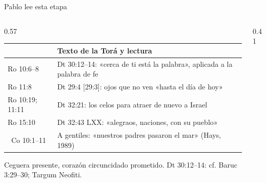 \begin{frame}{Pablo lee esta etapa}
\begin{columns}[c,onlytextwidth]
\begin{column}{0.57\textwidth}\scriptsize
\renewcommand{\arraystretch}{1.18}
\begin{tabular}{>{\RaggedRight\arraybackslash}p{1.45cm}>{\RaggedRight\arraybackslash}p{5.3cm}}
\toprule
{\color{ladrillo}\bfseries Pablo} & {\color{ladrillo}\bfseries Texto de la Torá y lectura}\\\midrule
Ro 10:6--8 & Dt 30:12--14: «cerca de ti está la palabra», aplicada a la palabra de fe\\
Ro 11:8 & Dt 29:4 [29:3]: ojos que no ven «hasta el día de hoy»\\
Ro 10:19; 11:11 & Dt 32:21: los celos para atraer de nuevo a Israel\\
Ro 15:10 & Dt 32:43 LXX: «alegraos, naciones, con su pueblo»\\
1~Co 10:1--11 & A gentiles: «nuestros padres pasaron el mar» (Hays, 1989)\\
\bottomrule
\end{tabular}
\elabpropia
\vspace{2pt}
\begin{notalam}[El arco de Dt 29--30]
Ceguera presente, corazón circuncidado prometido. Dt 30:12--14: cf. Baruc 3:29--30; Targum Neofiti.
\end{notalam}
\end{column}
\begin{column}{0.41\textwidth}\end{column}
\end{columns}
\end{frame}

